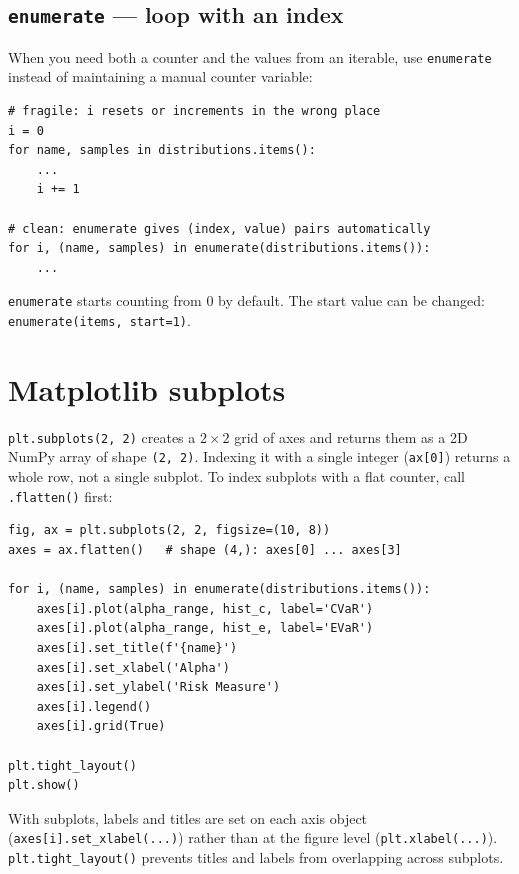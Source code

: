 \documentclass[11pt]{article}
\begin{document}
\subsection{\texttt{enumerate} --- loop with an index}

When you need both a counter and the values from an iterable, use
\texttt{enumerate} instead of maintaining a manual counter variable:

\begin{lstlisting}[style=python]
# fragile: i resets or increments in the wrong place
i = 0
for name, samples in distributions.items():
    ...
    i += 1

# clean: enumerate gives (index, value) pairs automatically
for i, (name, samples) in enumerate(distributions.items()):
    ...
\end{lstlisting}

\texttt{enumerate} starts counting from 0 by default. The start value can be
changed: \texttt{enumerate(items, start=1)}.

\section{Matplotlib subplots}

\texttt{plt.subplots(2, 2)} creates a $2\times2$ grid of axes and returns them
as a 2D NumPy array of shape \texttt{(2, 2)}. Indexing it with a single integer
(\texttt{ax[0]}) returns a whole row, not a single subplot. To index subplots
with a flat counter, call \texttt{.flatten()} first:

\begin{lstlisting}[style=python]
fig, ax = plt.subplots(2, 2, figsize=(10, 8))
axes = ax.flatten()   # shape (4,): axes[0] ... axes[3]

for i, (name, samples) in enumerate(distributions.items()):
    axes[i].plot(alpha_range, hist_c, label='CVaR')
    axes[i].plot(alpha_range, hist_e, label='EVaR')
    axes[i].set_title(f'{name}')
    axes[i].set_xlabel('Alpha')
    axes[i].set_ylabel('Risk Measure')
    axes[i].legend()
    axes[i].grid(True)

plt.tight_layout()
plt.show()
\end{lstlisting}

With subplots, labels and titles are set on each axis object
(\texttt{axes[i].set\_xlabel(...)}) rather than at the figure level
(\texttt{plt.xlabel(...)}). \texttt{plt.tight\_layout()} prevents titles and
labels from overlapping across subplots.
\end{document}
